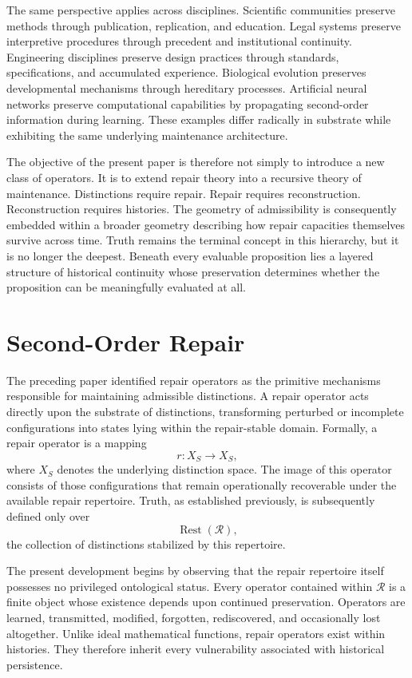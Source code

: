 \documentclass[12pt,oneside]{article}
\theoremstyle{plain}
\theoremstyle{definition}
\theoremstyle{remark}
\theoremstyle{plain}
\DeclareMathOperator{\Rest}{Rest}
\begin{document}
The same perspective applies across disciplines. Scientific communities preserve methods through
publication, replication, and education. Legal systems preserve interpretive procedures through
precedent and institutional continuity. Engineering disciplines preserve design practices through
standards, specifications, and accumulated experience. Biological evolution preserves developmental
mechanisms through hereditary processes. Artificial neural networks preserve computational
capabilities by propagating second-order information during learning. These examples differ
radically in substrate while exhibiting the same underlying maintenance architecture.

The objective of the present paper is therefore not simply to introduce a new class of operators.
It is to extend repair theory into a recursive theory of maintenance. Distinctions require repair.
Repair requires reconstruction. Reconstruction requires histories. The geometry of admissibility is
consequently embedded within a broader geometry describing how repair capacities themselves survive
across time. Truth remains the terminal concept in this hierarchy, but it is no longer the deepest.
Beneath every evaluable proposition lies a layered structure of historical continuity whose
preservation determines whether the proposition can be meaningfully evaluated at all.

\section{Second-Order Repair}

The preceding paper identified repair operators as the primitive mechanisms responsible for
maintaining admissible distinctions. A repair operator acts directly upon the substrate of
distinctions, transforming perturbed or incomplete configurations into states lying within the
repair-stable domain. Formally, a repair operator is a mapping
\[
r : X_S \rightarrow X_S,
\]
where $X_S$ denotes the underlying distinction space. The image of this operator consists of those
configurations that remain operationally recoverable under the available repair repertoire. Truth,
as established previously, is subsequently defined only over
\[
\Rest(\mathcal{R}),
\]
the collection of distinctions stabilized by this repertoire.

The present development begins by observing that the repair repertoire itself possesses no
privileged ontological status. Every operator contained within $\mathcal{R}$ is a finite object
whose existence depends upon continued preservation. Operators are learned, transmitted, modified,
forgotten, rediscovered, and occasionally lost altogether. Unlike ideal mathematical functions,
repair operators exist within histories. They therefore inherit every vulnerability associated with
historical persistence.
\end{document}
